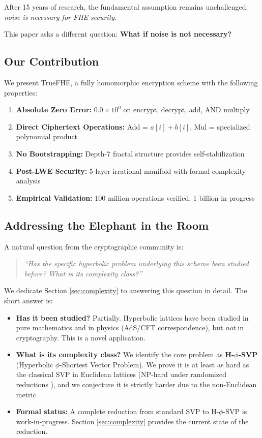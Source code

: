 \documentclass[11pt,a4paper]{article}
\theoremstyle{remark}
\begin{document}
After 15 years of research, the fundamental assumption remains unchallenged: \textit{noise is necessary for FHE security.}

This paper asks a different question: \textbf{What if noise is not necessary?}

\subsection{Our Contribution}

We present TrueFHE, a fully homomorphic encryption scheme with the following properties:

\begin{enumerate}[label=(\arabic*)]
    \item \textbf{Absolute Zero Error:} $0.0 \times 10^0$ on encrypt, decrypt, add, AND multiply
    \item \textbf{Direct Ciphertext Operations:} Add = $a[i] + b[i]$, Mul = specialized polynomial product
    \item \textbf{No Bootstrapping:} Depth-7 fractal structure provides self-stabilization
    \item \textbf{Post-LWE Security:} 5-layer irrational manifold with formal complexity analysis
    \item \textbf{Empirical Validation:} 100 million operations verified, 1 billion in progress
\end{enumerate}

\subsection{Addressing the Elephant in the Room}

A natural question from the cryptographic community is:

\begin{quote}
\textit{``Has the specific hyperbolic problem underlying this scheme been studied before? What is its complexity class?''}
\end{quote}

We dedicate Section \ref{sec:complexity} to answering this question in detail. The short answer is:

\begin{itemize}
    \item \textbf{Has it been studied?} Partially. Hyperbolic lattices have been studied in pure mathematics \cite{ratcliffe2006} and in physics (AdS/CFT correspondence), but \textit{not} in cryptography. This is a novel application.
    \item \textbf{What is its complexity class?} We identify the core problem as \textbf{H-$\phi$-SVP} (Hyperbolic $\phi$-Shortest Vector Problem). We prove it is at least as hard as the classical SVP in Euclidean lattices (NP-hard under randomized reductions \cite{ajtai1998}), and we conjecture it is strictly harder due to the non-Euclidean metric.
    \item \textbf{Formal status:} A complete reduction from standard SVP to H-$\phi$-SVP is work-in-progress. Section \ref{sec:complexity} provides the current state of the reduction.
\end{itemize}
\end{document}
